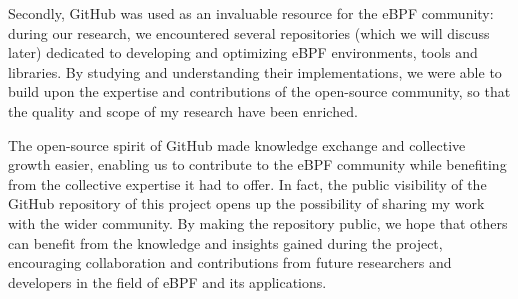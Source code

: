 Secondly, GitHub was used as an invaluable resource for the eBPF community: during our research, we encountered several repositories (which we will discuss later) dedicated to developing and optimizing eBPF environments, tools and libraries. 
By studying and understanding their implementations, we were able to build upon the expertise and contributions of the open-source community, so that the quality and scope of my research have been enriched.

The open-source spirit of GitHub made knowledge exchange and collective growth easier, enabling us to contribute to the eBPF community while benefiting from the collective expertise it had to offer.
In fact, the public visibility of the GitHub repository of this project opens up the possibility of sharing my work with the wider community. 
By making the repository public, we hope that others can benefit from the knowledge and insights gained during the project, encouraging collaboration and contributions from future researchers and developers in the field of eBPF and its applications.

